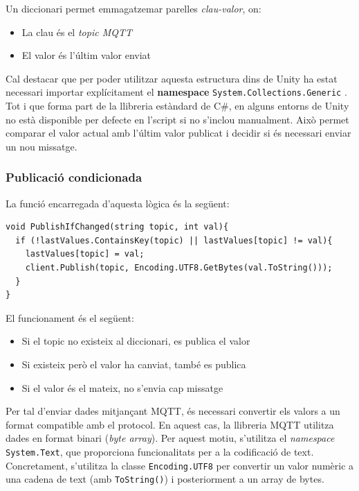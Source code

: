 \documentclass[a4paper,11pt,DIV=13,headings=normal,abstract=true,twoside=semi]{article}
\begin{document}
Un diccionari permet emmagatzemar parelles \textit{clau-valor}, on:
\begin{itemize}
    \item La clau és el \textit{topic MQTT}
    \item El valor és l'últim valor enviat
\end{itemize}

Cal destacar que per poder utilitzar aquesta estructura dins de Unity ha estat necessari importar explícitament el \textbf{namespace} \texttt{System.Collections.Generic} \cite{dotnet_collections}. Tot i que forma part de la llibreria estàndard de C\#, en alguns entorns de Unity no està disponible per defecte en l'script si no s'inclou manualment. Això permet comparar el valor actual amb l'últim valor publicat i decidir si és necessari enviar un nou missatge.

\subsubsection*{Publicació condicionada}

La funció encarregada d'aquesta lògica és la següent:

\begin{lstlisting}[style=simple]
void PublishIfChanged(string topic, int val){
  if (!lastValues.ContainsKey(topic) || lastValues[topic] != val){
    lastValues[topic] = val;
    client.Publish(topic, Encoding.UTF8.GetBytes(val.ToString()));
  }
}
\end{lstlisting}

El funcionament és el següent:

\begin{itemize}
    \item Si el topic no existeix al diccionari, es publica el valor
    \item Si existeix però el valor ha canviat, també es publica
    \item Si el valor és el mateix, no s'envia cap missatge
\end{itemize}

Per tal d'enviar dades mitjançant MQTT, és necessari convertir els valors a un format compatible amb el protocol. En aquest cas, la llibreria MQTT utilitza dades en format binari (\textit{byte array}). Per aquest motiu, s'utilitza el \textit{namespace} \texttt{System.Text}, que proporciona funcionalitats per a la codificació de text. Concretament, s'utilitza la classe \texttt{Encoding.UTF8} per convertir un valor numèric a una cadena de text (amb \texttt{ToString()}) i posteriorment a un array de bytes. 
\end{document}
